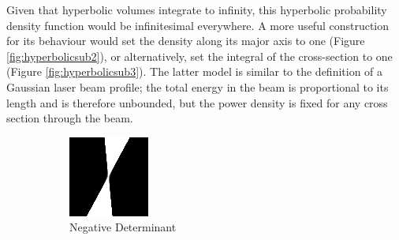 \documentclass[a4paper, 11pt, titlepage]{article}
\begin{document}
        Given that hyperbolic volumes integrate to infinity, this hyperbolic probability density function would be infinitesimal everywhere.  A more useful construction for its behaviour would set the density along its major axis to one (Figure \ref{fig:hyperbolicsub2}), or alternatively, set the integral of the cross-section to one (Figure \ref{fig:hyperbolicsub3}).
        The latter model is similar to the definition of a Gaussian laser beam profile; the total energy in the beam is proportional to its length and is therefore unbounded, but the power density is fixed for any cross section through the beam.
        \begin{figure}
        \centering
        \begin{subfigure}{.33\textwidth}
          \centering
          \includegraphics[width=.9\linewidth]{images/GaussianRay1.png}
          \caption{Negative Determinant}
          \label{fig:hyperbolicsub1}
        \end{subfigure}%
        \begin{subfigure}{.33\textwidth}
          \centering

\end{subfigure}
\end{figure}
\end{document}
